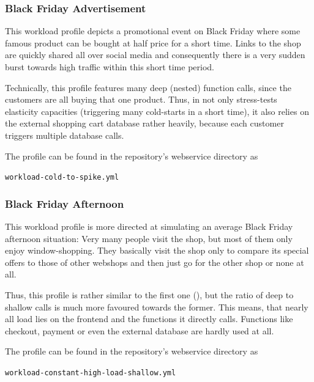 \documentclass[../main.tex]{subfiles}
\begin{document}
\subsubsection{Black Friday Advertisement}%
\label{ssub:webshopProfileBlackFridayAds}

This workload profile depicts a promotional event on Black Friday where some famous product can be bought at half price for a short time.
Links to the shop are quickly shared all over social media and consequently there is a very sudden burst towards high traffic
within this short time period.

Technically, this profile features many deep (nested) function calls, since the customers are all buying that one product.
Thus, in not only stress-tests elasticity capacities (triggering many cold-starts in a short time),
it also relies on the external shopping cart database rather heavily, because each customer triggers multiple database calls.

The profile can be found in the repository's webservice directory as 
\begin{tcolorbox}
\quad\texttt{workload-cold-to-spike.yml}
\end{tcolorbox}

\subsubsection{Black Friday Afternoon}%
\label{ssub:webshopProfileBlackFridayDaytime}

This workload profile is more directed at simulating an average Black Friday afternoon situation:
Very many people visit the shop, but most of them only enjoy window-shopping. 
They basically visit the shop only to compare its special offers to those of other webshops
and then just go for the other shop or none at all.

Thus, this profile is rather similar to the first one (),
but the ratio of deep to shallow calls is much more favoured towards the former.
This means, that nearly all load lies on the frontend and the functions it directly calls.
Functions like checkout, payment or even the external database are hardly used at all.

The profile can be found in the repository's webservice directory as 
\begin{tcolorbox}
\quad\texttt{workload-constant-high-load-shallow.yml}
\end{tcolorbox}
\end{document}
